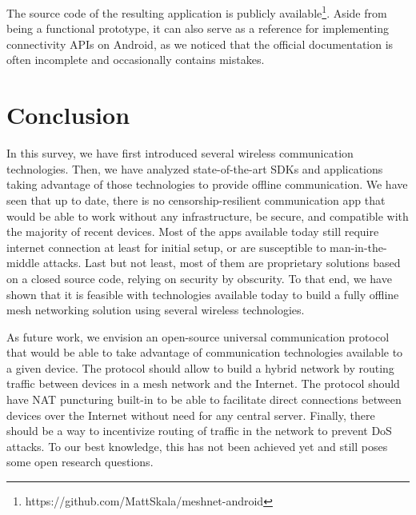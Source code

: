 \documentclass[conference,compsoc]{IEEEtran}
\begin{document}
The source code of the resulting application is publicly available\footnote{https://github.com/MattSkala/meshnet-android}. Aside from being a functional prototype, it can also serve as a reference for implementing connectivity APIs on Android, as we noticed that the official documentation is often incomplete and occasionally contains mistakes.


\section{Conclusion} \label{conclusion}


In this survey, we have first introduced several wireless communication technologies. Then, we have analyzed state-of-the-art SDKs and applications taking advantage of those technologies to provide offline communication. We have seen that up to date, there is no censorship-resilient communication app that would be able to work without any infrastructure, be secure, and compatible with the majority of recent devices. Most of the apps available today still require internet connection at least for initial setup, or are susceptible to man-in-the-middle attacks. Last but not least, most of them are proprietary solutions based on a closed source code, relying on security by obscurity.
To that end, we have shown that it is feasible with technologies available today to build a fully offline mesh networking solution using several wireless technologies.

As future work, we envision an open-source universal communication protocol that would be able to take advantage of communication technologies available to a given device. The protocol should allow to build a hybrid network by routing traffic between devices in a mesh network and the Internet. The protocol should have NAT puncturing built-in to be able to facilitate direct connections between devices over the Internet without need for any central server. Finally, there should be a way to incentivize routing of traffic in the network to prevent DoS attacks. To our best knowledge, this has not been achieved yet and still poses some open research questions.



\end{document}
